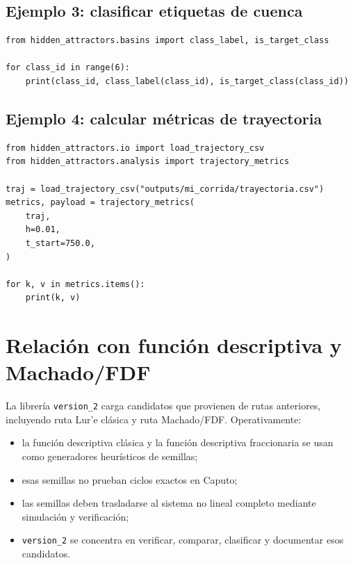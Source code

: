 \documentclass[11pt,letterpaper]{article}
\begin{document}
\subsection{Ejemplo 3: clasificar etiquetas de cuenca}

\begin{lstlisting}[style=python]
from hidden_attractors.basins import class_label, is_target_class

for class_id in range(6):
    print(class_id, class_label(class_id), is_target_class(class_id))
\end{lstlisting}

\subsection{Ejemplo 4: calcular métricas de trayectoria}

\begin{lstlisting}[style=python]
from hidden_attractors.io import load_trajectory_csv
from hidden_attractors.analysis import trajectory_metrics

traj = load_trajectory_csv("outputs/mi_corrida/trayectoria.csv")
metrics, payload = trajectory_metrics(
    traj,
    h=0.01,
    t_start=750.0,
)

for k, v in metrics.items():
    print(k, v)
\end{lstlisting}

\section{Relación con función descriptiva y Machado/FDF}

La librería \texttt{version\_2} carga candidatos que provienen de rutas anteriores, incluyendo ruta Lur'e clásica y ruta Machado/FDF. Operativamente:

\begin{itemize}
  \item la función descriptiva clásica y la función descriptiva fraccionaria se usan como generadores heurísticos de semillas;
  \item esas semillas no prueban ciclos exactos en Caputo;
  \item las semillas deben trasladarse al sistema no lineal completo mediante simulación y verificación;
  \item \texttt{version\_2} se concentra en verificar, comparar, clasificar y documentar esos candidatos.
\end{itemize}
\end{document}
